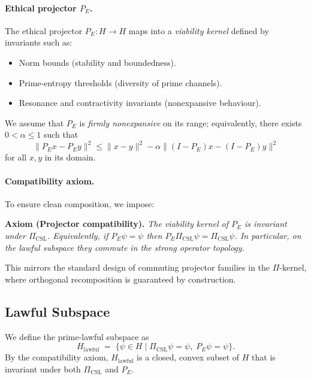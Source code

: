 \documentclass[11pt]{article}
\begin{document}
\paragraph{Ethical projector $P_E$.}

The ethical projector $P_E : H \to H$ maps into a \emph{viability kernel} defined by invariants such as:
\begin{itemize}[leftmargin=1.5em]
  \item Norm bounds (stability and boundedness).
  \item Prime-entropy thresholds (diversity of prime channels).
  \item Resonance and contractivity invariants (nonexpansive behaviour).
\end{itemize}
We assume that $P_E$ is \emph{firmly nonexpansive} on its range; equivalently, there exists $0 < \alpha \leq 1$ such that
\begin{equation}
  \|P_E x - P_E y\|^2 \le \|x - y\|^2 - \alpha \|(I - P_E)x - (I - P_E)y\|^2
\end{equation}
for all $x,y$ in its domain.

\paragraph{Compatibility axiom.}

To ensure clean composition, we impose:

\medskip\noindent
\textbf{Axiom (Projector compatibility).}
\emph{The viability kernel of $P_E$ is invariant under $\Pi_{\text{CSL}}$.
Equivalently, if $P_E \psi = \psi$ then $P_E \Pi_{\text{CSL}} \psi = \Pi_{\text{CSL}} \psi$.
In particular, on the lawful subspace they commute in the strong operator topology.}

This mirrors the standard design of commuting projector families in the $\Pi$-kernel, where orthogonal recomposition is guaranteed by construction.

\subsection{Lawful Subspace}

We define the prime-lawful subspace as
\begin{equation}
  H_{\text{lawful}} \;=\; \{ \psi \in H \mid \Pi_{\text{CSL}}\psi = \psi,\; P_E\psi = \psi \}.
\end{equation}
By the compatibility axiom, $H_{\text{lawful}}$ is a closed, convex subset of $H$ that is invariant under both $\Pi_{\text{CSL}}$ and $P_E$.
\end{document}
